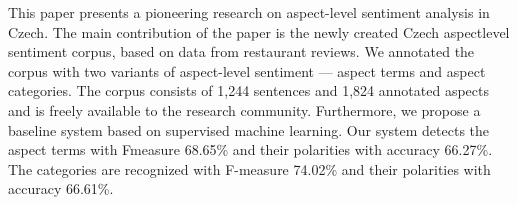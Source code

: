This paper presents a pioneering research on aspect-level sentiment analysis in Czech. The main contribution of the paper is the newly created Czech aspectlevel sentiment corpus, based on data from restaurant reviews. We annotated the corpus with two variants of aspect-level sentiment --- aspect terms and aspect categories. The corpus consists of 1,244 sentences and 1,824 annotated aspects and is freely available to the research community. Furthermore, we propose a baseline system based on supervised machine learning. Our system detects the aspect terms with Fmeasure 68.65\% and their polarities with accuracy 66.27\%. The categories are recognized with F-measure 74.02\% and their polarities with accuracy 66.61\%.
